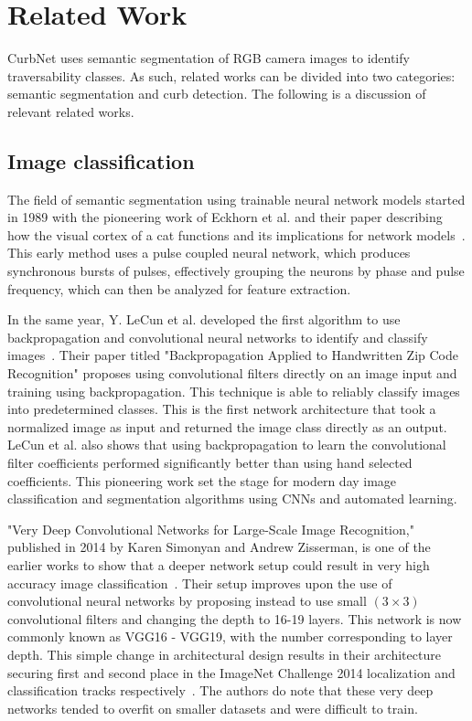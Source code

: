 \chapter{Related Work}\label{chap:relatedwork}
CurbNet uses semantic segmentation of RGB camera images to identify traversability classes.
As such, related works can be divided into two categories: semantic segmentation and curb detection.
The following is a discussion of relevant related works.

\section{Image classification}\label{section:relatedwork-classification}
The field of semantic segmentation using trainable neural network models started in 1989 with the pioneering work of Eckhorn et al. and their paper describing how the visual cortex of a cat functions and its implications for network models~\cite{eckhorncat}.
This early method uses a pulse coupled neural network, which produces synchronous bursts of pulses, effectively grouping the neurons by phase and pulse frequency, which can then be analyzed for feature extraction.

In the same year, Y. LeCun et al. developed the first algorithm to use backpropagation and convolutional neural networks to identify and classify images~\cite{zipcode}.
Their paper titled "Backpropagation Applied to Handwritten Zip Code Recognition" proposes using convolutional filters directly on an image input and training using backpropagation.
This technique is able to reliably classify images into predetermined classes.
This is the first network architecture that took a normalized image as input and returned the image class directly as an output.
LeCun et al. also shows that using backpropagation to learn the convolutional filter coefficients performed significantly better than using hand selected coefficients.
This pioneering work set the stage for modern day image classification and segmentation algorithms using CNNs and automated learning.

"Very Deep Convolutional Networks for Large-Scale Image Recognition," published in 2014 by Karen Simonyan and Andrew Zisserman, is one of the earlier works to show that a deeper network setup could result in very high accuracy image classification~\cite{vgg}.
Their setup improves upon the use of convolutional neural networks by proposing instead to use small $\left(3 \times 3\right)$ convolutional filters and changing the depth to 16-19 layers.
This network is now commonly known as VGG16 - VGG19, with the number corresponding to layer depth.
This simple change in architectural design results in their architecture securing first and second place in the ImageNet Challenge 2014 localization and classification tracks respectively~\cite{vgg}.
The authors do note that these very deep networks tended to overfit on smaller datasets and were difficult to train.


